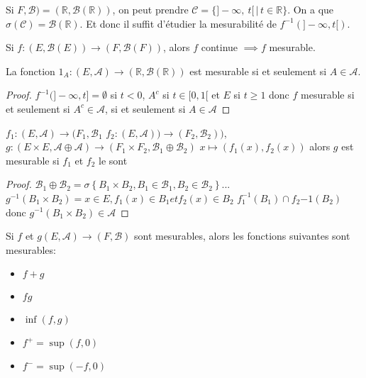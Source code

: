 \begin{example}[Application]
	Si $F, \mathscr{B}) = (\mathbb{R}, \mathscr{B}(\mathbb{R}))$, on peut prendre $\mathscr{C} = \{ ]-\infty,\   t[ \, | \, t \in \mathbb{R} \}$. On a que
				$\sigma(\mathscr{C}) = \mathscr{B}(\mathbb{R})$. Et donc il suffit d'étudier la mesurabilité de $f^{-1}(]-\infty, t[)$.
\end{example}


\begin{remarque}
	Si $f : (E,\mathscr{B}(E)) \rightarrow (F,\mathscr{B}(F))$, alors $f$ continue $\implies f$ mesurable.
\end{remarque}


\begin{prop}
	La fonction $\mathscr{1}_A : (E,\mathscr{A}) \rightarrow (\mathbb{R},\mathscr{B}(\mathbb{R}))$ est mesurable si et seulement si $A \in \mathscr{A}$.
\end{prop}

\begin{proof}
	$f^{-1}(]-\infty, t] = \emptyset$ si $t < 0$, $A^c$ si $t \in [0,1[$ et $E$ si $t \geq 1$
	donc $f$ mesurable si et seulement si $A^c\in \mathscr{A}$, si et seulement si $A\in \mathscr{A}$
\end{proof}

\begin{prop}
	$f_1 : (E,\mathscr{A}) \rightarrow (F_1,\mathscr{B_1}$
	$f_2 : (E,\mathscr{A})) \rightarrow (F_2,\mathscr{B_2}))$,
	$g: (E \times E,\mathscr{A} \oplus \mathscr{A}) \rightarrow (F_1 \times F_2,\mathscr{B_1} \oplus \mathscr{B_2})$
	$x\mapsto (f_1(x), f_2(x))$
	alors $g$ est mesurable si $f_1$ et $f_2$ le sont
\end{prop}

\begin{proof}
	$\mathscr{B_1} \oplus \mathscr{B_2} = \sigma \left\{ B_1 \times B_2, B_1 \in \mathscr{B_1}, B_2 \in \mathscr{B_2} \right\}...$
	$g^{-1}(B_1 \times B_2) = {x \in E, f_1(x) \in B_1 et f_2(x) \in B_2  }$
	$f_1^{-1}(B_1) \cap f_2{-1}(B_2)$
	donc $g^{-1}(B_1 \times B_2) \in \mathscr{A}$
\end{proof}



\begin{prop}
	Si $f$ et $g (E,\mathscr{A}) \rightarrow (F,\mathscr{B})$
	sont mesurables, alors les fonctions suivantes sont mesurables:
	\begin{itemize}
		\item $f + g$
		\item $fg$
		\item $\inf(f,g)$
		\item $f^+ = \sup(f,0)$
		\item $f^- = \sup(-f,0)$
	\end{itemize}
\end{prop}

